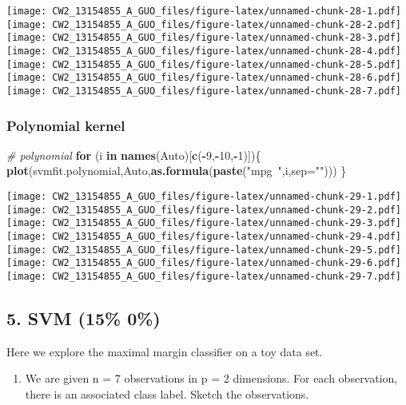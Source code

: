 \documentclass[]{article}
\newenvironment{Shaded}{\begin{snugshade}}{\end{snugshade}}
\newcommand{\KeywordTok}[1]{\textcolor[rgb]{0.13,0.29,0.53}{\textbf{#1}}}
\newcommand{\DataTypeTok}[1]{\textcolor[rgb]{0.13,0.29,0.53}{#1}}
\newcommand{\DecValTok}[1]{\textcolor[rgb]{0.00,0.00,0.81}{#1}}
\newcommand{\StringTok}[1]{\textcolor[rgb]{0.31,0.60,0.02}{#1}}
\newcommand{\CommentTok}[1]{\textcolor[rgb]{0.56,0.35,0.01}{\textit{#1}}}
\newcommand{\ControlFlowTok}[1]{\textcolor[rgb]{0.13,0.29,0.53}{\textbf{#1}}}
\newcommand{\OperatorTok}[1]{\textcolor[rgb]{0.81,0.36,0.00}{\textbf{#1}}}
\newcommand{\NormalTok}[1]{#1}
\providecommand{\tightlist}{%
  \setlength{\itemsep}{0pt}\setlength{\parskip}{0pt}}
\begin{document}
\texttt{[image: CW2\_13154855\_A\_GUO\_files/figure-latex/unnamed-chunk-28-1.pdf]}
\texttt{[image: CW2\_13154855\_A\_GUO\_files/figure-latex/unnamed-chunk-28-2.pdf]}
\texttt{[image: CW2\_13154855\_A\_GUO\_files/figure-latex/unnamed-chunk-28-3.pdf]}
\texttt{[image: CW2\_13154855\_A\_GUO\_files/figure-latex/unnamed-chunk-28-4.pdf]}
\texttt{[image: CW2\_13154855\_A\_GUO\_files/figure-latex/unnamed-chunk-28-5.pdf]}
\texttt{[image: CW2\_13154855\_A\_GUO\_files/figure-latex/unnamed-chunk-28-6.pdf]}
\texttt{[image: CW2\_13154855\_A\_GUO\_files/figure-latex/unnamed-chunk-28-7.pdf]}

\subsubsection{Polynomial kernel}\label{polynomial-kernel-1}

\begin{Shaded}
\begin{Highlighting}[]
\CommentTok{# polynomial}
\ControlFlowTok{for}\NormalTok{ (i }\ControlFlowTok{in} \KeywordTok{names}\NormalTok{(Auto)[}\KeywordTok{c}\NormalTok{(}\OperatorTok{-}\DecValTok{9}\NormalTok{,}\OperatorTok{-}\DecValTok{10}\NormalTok{,}\OperatorTok{-}\DecValTok{1}\NormalTok{)])\{}
        \KeywordTok{plot}\NormalTok{(svmfit.polynomial,Auto,}\KeywordTok{as.formula}\NormalTok{(}\KeywordTok{paste}\NormalTok{(}\StringTok{"mpg~"}\NormalTok{,i,}\DataTypeTok{sep=}\StringTok{""}\NormalTok{)))}
\NormalTok{\}}
\end{Highlighting}
\end{Shaded}

\texttt{[image: CW2\_13154855\_A\_GUO\_files/figure-latex/unnamed-chunk-29-1.pdf]}
\texttt{[image: CW2\_13154855\_A\_GUO\_files/figure-latex/unnamed-chunk-29-2.pdf]}
\texttt{[image: CW2\_13154855\_A\_GUO\_files/figure-latex/unnamed-chunk-29-3.pdf]}
\texttt{[image: CW2\_13154855\_A\_GUO\_files/figure-latex/unnamed-chunk-29-4.pdf]}
\texttt{[image: CW2\_13154855\_A\_GUO\_files/figure-latex/unnamed-chunk-29-5.pdf]}
\texttt{[image: CW2\_13154855\_A\_GUO\_files/figure-latex/unnamed-chunk-29-6.pdf]}
\texttt{[image: CW2\_13154855\_A\_GUO\_files/figure-latex/unnamed-chunk-29-7.pdf]}

\subsection{5. SVM (15\% \textbar{} 0\%)}\label{svm-15-0}

Here we explore the maximal margin classifier on a toy data set.

\begin{enumerate}
\def\labelenumi{(\alph{enumi})}
\tightlist
\item
  We are given n = 7 observations in p = 2 dimensions. For each
  observation, there is an associated class label. Sketch the
  observations.
\end{enumerate}
\end{document}
